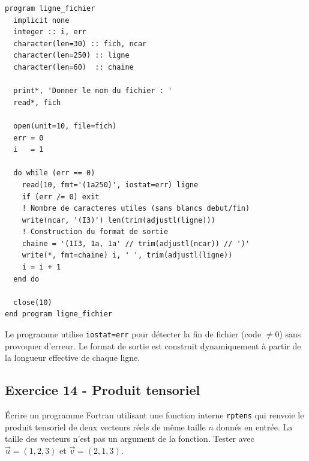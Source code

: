 \documentclass[12pt,a4paper]{article}
\begin{document}
\begin{boitecorrige}
\begin{lstlisting}
program ligne_fichier
  implicit none
  integer :: i, err
  character(len=30) :: fich, ncar
  character(len=250) :: ligne
  character(len=60)  :: chaine

  print*, 'Donner le nom du fichier : '
  read*, fich

  open(unit=10, file=fich)
  err = 0
  i   = 1

  do while (err == 0)
    read(10, fmt='(1a250)', iostat=err) ligne
    if (err /= 0) exit
    ! Nombre de caracteres utiles (sans blancs debut/fin)
    write(ncar, '(I3)') len(trim(adjustl(ligne)))
    ! Construction du format de sortie
    chaine = '(1I3, 1a, 1a' // trim(adjustl(ncar)) // ')'
    write(*, fmt=chaine) i, ' ', trim(adjustl(ligne))
    i = i + 1
  end do

  close(10)
end program ligne_fichier
\end{lstlisting}

Le programme utilise \texttt{iostat=err} pour détecter la fin de fichier (code $\neq 0$) sans provoquer d'erreur. Le format de sortie est construit dynamiquement à partir de la longueur effective de chaque ligne.
\end{boitecorrige}

\subsection*{Exercice 14 - Produit tensoriel \niveau{\difficile}}

\begin{boiteexercice}
Écrire un programme Fortran utilisant une fonction interne \texttt{rptens} qui renvoie le produit tensoriel de deux vecteurs réels de même taille $n$ donnés en entrée. La taille des vecteurs n'est pas un argument de la fonction. Tester avec $\vec{u}=(1,2,3)$ et $\vec{v}=(2,1,3)$.
\end{boiteexercice}
\end{document}
